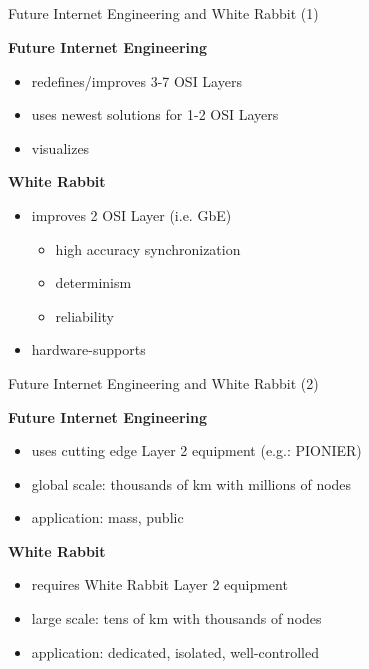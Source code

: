 \documentclass[compress,red]{beamer}
\begin{document}
\subsection{}
\begin{frame}{Future Internet Engineering and White Rabbit (1) }

\textbf{Future Internet Engineering}
    \begin{itemize}
      \item redefines/improves 3-7 OSI Layers
      \item uses newest solutions for 1-2 OSI Layers
      \item visualizes
    \end{itemize}    
\textbf{White Rabbit}
    \begin{itemize}
      \item improves 2 OSI Layer (i.e. GbE)
      \begin{itemize}
        \item high accuracy synchronization
        \item determinism
        \item reliability
      \end{itemize}    
      \item hardware-supports
    \end{itemize}    
\end{frame}
\begin{frame}{Future Internet Engineering and White Rabbit (2) }


	\textbf{Future Internet Engineering}
	  \begin{itemize}
		\item uses cutting edge Layer 2 equipment (e.g.: PIONIER)
		\item global scale: thousands of km with millions of nodes
		\item application: mass, public
	  \end{itemize}
	      \textbf{White Rabbit}
	  \begin{itemize}
		\item requires White Rabbit Layer 2 equipment
		\item large scale: tens of km with thousands of nodes
		\item application: dedicated, isolated, well-controlled
	  \end{itemize}

\end{frame}
\end{document}

